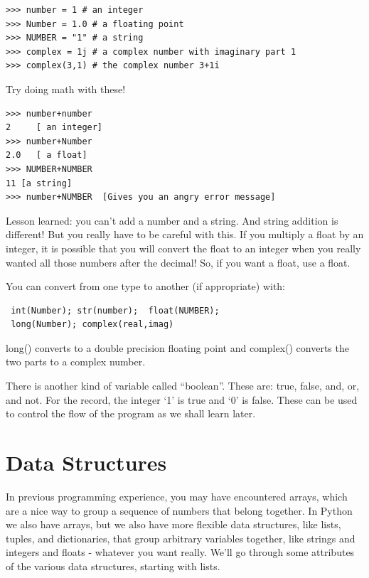 \documentclass[11pt]{book}
\begin{document}
{{{{ \color{blue} \begin{verbatim}
>>> number = 1 # an integer
>>> Number = 1.0 # a floating point
>>> NUMBER = "1" # a string
>>> complex = 1j # a complex number with imaginary part 1
>>> complex(3,1) # the complex number 3+1i
\end{verbatim}}
\noindent
{Try doing math with these!}
{ \color{blue} \begin{verbatim}
>>> number+number
2     [ an integer]
>>> number+Number
2.0   [ a float]
>>> NUMBER+NUMBER
11 [a string]
>>> number+NUMBER  [Gives you an angry error message]
\end{verbatim}}
\noindent
 Lesson learned: you can't add a number and a string.  And string addition is different!  But you really have to be careful with this.  If you multiply a float by an integer, it is possible that you will convert the float to an integer when you really wanted all those numbers after the decimal! So, if you want a float, use a float.

{ You can convert from one type to another (if appropriate) with:}
{ \color{blue} \begin{verbatim}
 int(Number); str(number);  float(NUMBER);
 long(Number); complex(real,imag)
 \end{verbatim}}

\noindent
{\color{blue}long()} converts to a double precision floating point and {\color{blue}complex()} converts the two parts to a complex number.

 There is another kind of variable called ``boolean''. These are: {\color{blue}true}, {\color{blue}false}, {\color{blue}and}, {\color{blue}or}, and {\color{blue}not}.
For the record, the integer  `1' is {\color{blue}true} and  `0' is {\color{blue}false}.
These can be used to control the flow of the program as we shall learn later.

\section{Data Structures}

In previous programming experience, you may have encountered arrays, which are a nice way to group a sequence of numbers that belong together.  In Python we also have arrays, but we also have more flexible data structures, like lists, tuples, and dictionaries,  that group arbitrary variables together, like strings and integers and floats - whatever you want really. We'll go through some attributes of the various data structures, starting with lists.

}}}
\end{document}
